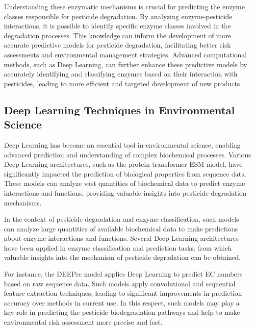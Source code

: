Understanding these enzymatic mechanisms is crucial for predicting the enzyme classes responsible for pesticide degradation. By analyzing enzyme-pesticide interactions, it is possible to identify specific enzyme classes involved in the degradation processes. This knowledge can inform the development of more accurate predictive models for pesticide degradation, facilitating better risk assessments and environmental management strategies. Advanced computational methods, such as Deep Learning, can further enhance these predictive models by accurately identifying and classifying enzymes based on their interaction with pesticides, leading to more efficient and targeted development of new products.

\subsection{Deep Learning Techniques in Environmental Science}
\label{sec:Deep Learning Techniques in Environmental Science}

Deep Learning has become an essential tool in environmental science, enabling advanced prediction and understanding of complex biochemical processes. Various Deep Learning architectures, such as the protein-transformer ESM model, have significantly impacted the prediction of biological properties from sequence data. These models can analyze vast quantities of biochemical data to predict enzyme interactions and functions, providing valuable insights into pesticide degradation mechanisms. \autocite{rivesBiologicalStructureFunction2021}

In the context of pesticide degradation and enzyme classification, such models can analyze large quantities of available biochemical data to make predictions about enzyme interactions and functions. Several Deep Learning architectures have been applied in enzyme classification and prediction tasks, from which valuable insights into the mechanism of pesticide degradation can be obtained.

For instance, the DEEPre model applies Deep Learning to predict EC numbers based on raw sequence data. Such models apply convolutional and sequential feature extraction techniques, leading to significant improvements in prediction accuracy over methods in current use. In this respect, such models may play a key role in predicting the pesticide biodegradation pathways and help to make environmental risk assessment more precise and fast. \autocite{liDEEPreSequencebasedEnzyme2017}

